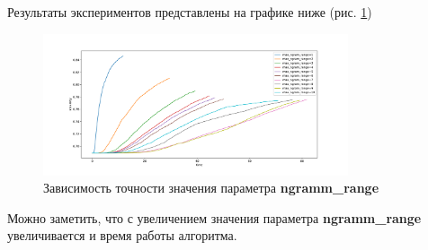 \documentclass[a4paper, 11pt]{article}
\begin{document}
            Результаты экспериментов представлены на графике ниже (рис. \ref{extra1:ngramm_accuracy})
            \begin{figure}[H] \label{extra1}
                    \begin{center}
                        \caption{Зависимость  точности значения параметра \textbf{ngramm\_range}} \label{extra1:ngramm_accuracy}
                        \includegraphics[width=0.8\textwidth, height=0.25\textheight]{../graphs/ngram_exp.pdf}
                    \end{center}
            \end{figure}
            Можно заметить, что с увеличением значения параметра \textbf{ngramm\_range} увеличивается и время работы алгоритма.
            
    
       
        
        
            
\end{document}
